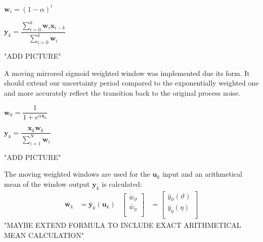 \documentclass[class=article, crop=false]{standalone}
\begin{document}

\vspace{0.5cm}

\begin{center}

$ \textbf{w}_i = (1 - \alpha)^i $

\vspace{0.5cm}
$ \textbf{y}_k = \dfrac{\sum_{i=0}^{k} \textbf{w}_i \textbf{x}_{i-k}}{ \sum_{i=0}^{k} \textbf{w}_i} $

\end{center}
"ADD PICTURE"
\vspace{0.5cm}

A moving mirrored sigmoid weighted window was implemented due its form. It should extend our uncertainty period compared to the exponentially weighted one and more accurately reflect the transition back to the original process noise.

\vspace{0.5cm}

\begin{center}

$ \textbf{w}_k = \dfrac{ 1 }{ 1 + e^{\alpha \textbf{x}_k} } $ \\

\vspace{0.5cm}

$ \textbf{y}_k = \dfrac{\textbf{x}_k \textbf{w}_k}{ \sum_{i=1}^{N} \textbf{w}_i } $

\end{center}
"ADD PICTURE"
\vspace{0.5cm}

The moving weighted windows are used for the $\textbf{u}_k$ input and an arithmetical mean of the window output $ \textbf{y}_k $ is calculated:
\begin{align*}
    \bar{\textbf{w}}_k &= \bar{\textbf{y}}_k(\textbf{u}_k) &
\begin{bmatrix}
  \bar{w}_{\vartheta}                 \\
  \bar{w}_{\eta} \\
 \end{bmatrix} &=
 \begin{bmatrix}
   \bar{y}_{\vartheta}(\vartheta)                  \\
   \bar{y}_{\eta}(\eta) \\
 \end{bmatrix}
\end{align*}
"MAYBE EXTEND FORMULA TO INCLUDE EXACT ARITHMETICAL MEAN CALCULATION"
\end{document}
